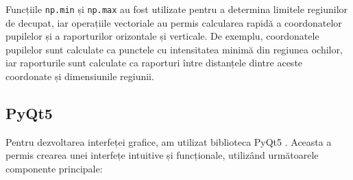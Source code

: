 \documentclass[12pt,a4paper]{article}
\begin{document}
Funcțiile \texttt{np.min} și \texttt{np.max} au fost utilizate pentru a determina limitele regiunilor de decupat, iar operațiile vectoriale au permis calcularea rapidă a coordonatelor pupilelor și a raporturilor orizontale și verticale. De exemplu, coordonatele pupilelor sunt calculate ca punctele cu intensitatea minimă din regiunea ochilor, iar raporturile sunt calculate ca raporturi între distanțele dintre aceste coordonate și dimensiunile regiunii.
\subsection{PyQt5}
\hspace{6mm}Pentru dezvoltarea interfeței grafice, am utilizat biblioteca PyQt5 \cite{pyqt5}. Aceasta a permis crearea unei interfețe intuitive și funcționale, utilizând următoarele componente principale:
\end{document}
